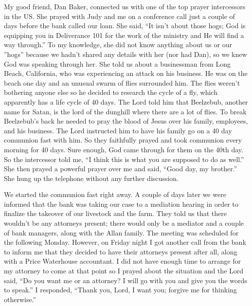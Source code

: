\documentclass[oneside]{book}
\begin{document}
My good friend, Dan Baker, connected us with one of the top prayer intercessors in the US. She prayed with Judy and me on a conference call just a couple of days before the bank called our loan. She said, “It isn't about those hogs; God is equipping you in Deliverance 101 for the work of the ministry and He will find a way through.” To my knowledge, she did not know anything about us or our ”hogs” because we hadn’t shared any details with her (nor had Dan), so we knew God was speaking through her. She told us about a businessman from Long Beach, California, who was experiencing an attack on his business. He was on the beach one day and an unusual swarm of flies surrounded him. The flies weren’t bothering anyone else so he decided to research the cycle of a fly, which apparently has a life cycle of 40 days. The Lord told him that Beelzebub, another name for Satan, is the lord of the dunghill where there are a lot of flies. To break Beelzebub’s back he needed to pray the blood of Jesus over his family, employees, and his business. The Lord instructed him to have his family go on a 40 day communion fast with him. So they faithfully prayed and took communion every morning for 40 days. Sure enough, God came through for them on the 40th day. So the intercessor told me, “I think this is what you are supposed to do as well.” She then prayed a powerful prayer over me and said, “Good day, my brother.” She hung up the telephone without any further discussion.

We started the communion fast right away. A couple of days later we were informed that the bank was taking our case to a mediation hearing in order to finalize the takeover of our livestock and the farm. They told us that there wouldn’t be any attorneys present; there would only be a mediator and a couple of bank managers, along with the Allan family. The meeting was scheduled for the following Monday. However, on Friday night I got another call from the bank to inform me that they decided to have their attorneys present after all, along with a Price Waterhouse accountant. I did not have enough time to arrange for my attorney to come at that point so I prayed about the situation and the Lord said, “Do you want me or an attorney? I will go with you and give you the words to speak.” I responded, “Thank you, Lord, I want you; forgive me for thinking otherwise.”
\end{document}
